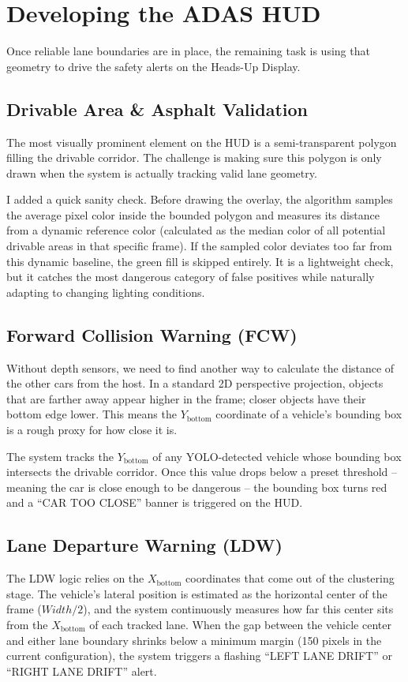 \documentclass[a4paper, 11pt]{article}
\begin{document}
	\section{Developing the ADAS HUD}
	Once reliable lane boundaries are in place, the remaining task is using that geometry to drive the safety alerts on the Heads-Up Display.
	
	\subsection{Drivable Area \& Asphalt Validation}
	The most visually prominent element on the HUD is a semi-transparent polygon filling the drivable corridor. The challenge is making sure this polygon is only drawn when the system is actually tracking valid lane geometry.
	
	I added a quick sanity check. Before drawing the overlay, the algorithm samples the average pixel color inside the bounded polygon and measures its distance from a dynamic reference color (calculated as the median color of all potential drivable areas in that specific frame). If the sampled color deviates too far from this dynamic baseline, the green fill is skipped entirely. It is a lightweight check, but it catches the most dangerous category of false positives while naturally adapting to changing lighting conditions.
	
	\subsection{Forward Collision Warning (FCW)}
	Without depth sensors, we need to find another way to calculate the distance of the other cars from the host. In a standard 2D perspective projection, objects that are farther away appear higher in the frame; closer objects have their bottom edge lower. This means the $Y_{\text{bottom}}$ coordinate of a vehicle's bounding box is a rough proxy for how close it is.
	
	The system tracks the $Y_{\text{bottom}}$ of any YOLO-detected vehicle whose bounding box intersects the drivable corridor. Once this value drops below a preset threshold -- meaning the car is close enough to be dangerous -- the bounding box turns red and a ``CAR TOO CLOSE'' banner is triggered on the HUD.
	
	\subsection{Lane Departure Warning (LDW)}
	The LDW logic relies on the $X_{\text{bottom}}$ coordinates that come out of the clustering stage. The vehicle's lateral position is estimated as the horizontal center of the frame ($Width / 2$), and the system continuously measures how far this center sits from the $X_{\text{bottom}}$ of each tracked lane. When the gap between the vehicle center and either lane boundary shrinks below a minimum margin (150 pixels in the current configuration), the system triggers a flashing ``LEFT LANE DRIFT'' or ``RIGHT LANE DRIFT'' alert.
	
\end{document}
